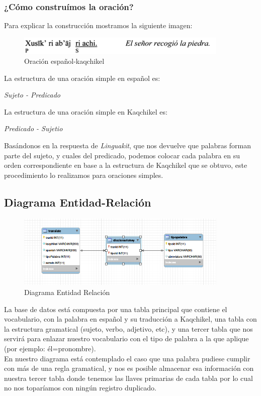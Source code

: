 \documentclass[a4paper,openright,11pt]{article}
\begin{document}
\subsubsection{¿Cómo construímos la oración?}
Para explicar la construcción mostramos la siguiente imagen:\\
\begin{figure}[H]
	\centering
	\includegraphics[width=0.9\textwidth]{oracion}
	\caption{Oración español-kaqchikel}
	\label{fig:kaq}
\end{figure}
La estructura de una oración simple en español es:
\begin{center}
	\textit{Sujeto - Predicado}\\
\end{center}

La estructura de una oración simple en Kaqchikel es:
\begin{center}
	\textit{Predicado - Sujetio}\\
\end{center}

Basándonos en la respuesta de \textit{Linguakit}, que nos devuelve que palabras forman parte del sujeto, y cuales del predicado, podemos colocar cada palabra en su orden correspondiente en base a la estructura de Kaqchikel que se obtuvo, este procedimiento lo realizamos para oraciones simples.

\newpage
\subsection{Diagrama Entidad-Relación}
\begin{figure}[H]
	\centering
	\includegraphics[width=0.9\textwidth]{er}
	\caption{Diagrama Entidad Relación}
	\label{fig:er}
\end{figure}
La base de datos está compuesta por una tabla principal que contiene el vocabulario, con la palabra en español y su traducción a Kaqchikel, una tabla con la estructura gramatical (sujeto, verbo, adjetivo, etc), y una tercer tabla que nos servirá para enlazar nuestro vocabulario con el tipo de palabra a la que aplique (por ejemplo: él=pronombre).\\
En nuestro diagrama está contemplado el caso que una palabra pudiese cumplir con más de una regla gramatical, y nos es posible almacenar esa información con nuestra tercer tabla donde tenemos las llaves primarias de cada tabla por lo cual no nos toparíamos con ningún registro duplicado.
\end{document}
